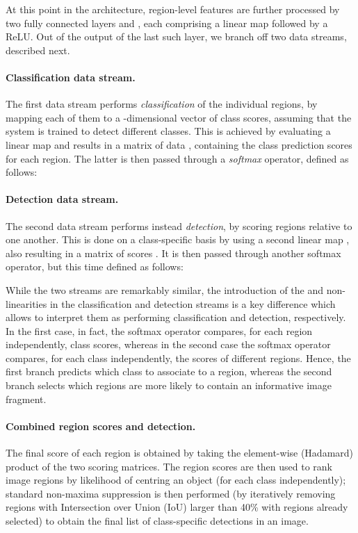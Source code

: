 \documentclass[10pt,twocolumn,letterpaper]{article}
\begin{document}
At this point in the architecture, region-level features are further processed by two fully connected layers  and , each comprising a linear map followed by a ReLU. Out of the output of the last such layer, we branch off two data streams, described next.

\paragraph{Classification data stream.} The first data stream performs \emph{classification} of the individual regions, by mapping each of them to a -dimensional vector of class scores, assuming that the system is trained to detect  different classes. This is achieved by evaluating a linear map  and results in a matrix of data , containing the class prediction scores for each region. The latter is then passed through a \emph{softmax} operator, defined as follows:


\paragraph{Detection data stream.} The second data stream performs instead \emph{detection}, by scoring regions relative to one another. This is done on a class-specific basis by using a second linear map , also resulting in a matrix of scores . It is then passed through another softmax operator, but this time defined as follows:


While the two streams are remarkably similar, the introduction of the  and  non-linearities in the classification and detection streams is a key difference which allows to interpret them as performing classification and detection, respectively. In the first case, in fact, the softmax operator compares, for each region independently, class scores, whereas in the second case the softmax operator compares, for each class independently, the scores of different regions. Hence, the first branch predicts which class to associate to a region, whereas the second branch selects which regions are more likely to contain an informative image fragment.

\paragraph{Combined region scores and detection.} The final score of each region is obtained by taking the element-wise (Hadamard) product  of the two scoring matrices. The region scores are then used to rank image regions by likelihood of centring an object (for each class independently); standard non-maxima suppression is then performed (by iteratively removing regions with Intersection over Union (IoU) larger than 40\% with regions already selected) to obtain the final list of class-specific detections in an image.
\end{document}
